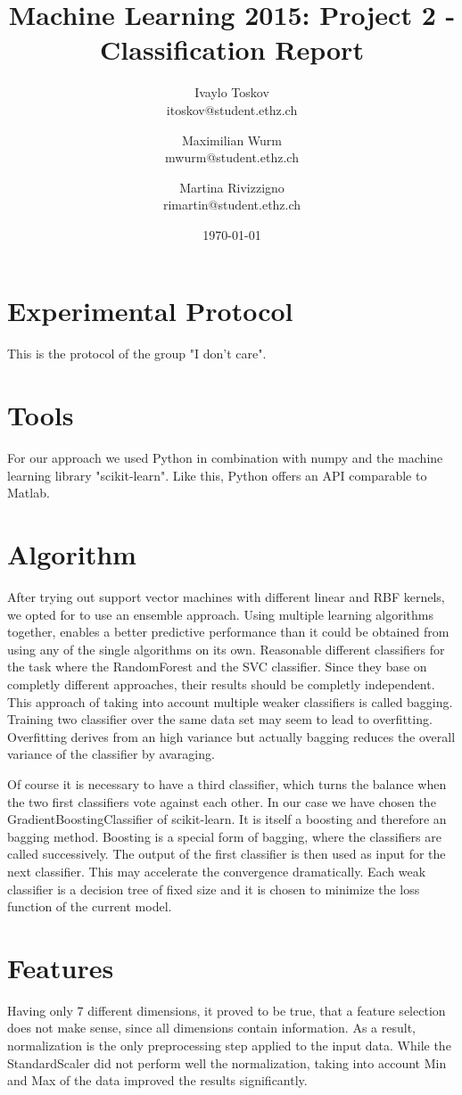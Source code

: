 \documentclass[a4paper, 11pt]{article}
\title{Machine Learning 2015: Project 2 - Classification Report}
\author{Ivaylo Toskov \\ itoskov@student.ethz.ch \and Maximilian Wurm \\ mwurm@student.ethz.ch \and 
	Martina Rivizzigno \\ rimartin@student.ethz.ch\\}
\date{\today}
\begin{document}
	\maketitle
	
	\section*{Experimental Protocol}
	This is the protocol of the group "I don't care".
	
	\section{Tools}
	For our approach we used Python in combination with numpy and the machine learning library "scikit-learn". Like this, Python offers an API comparable to Matlab.
	
	\section{Algorithm}
	After trying out support vector machines with different linear and RBF kernels, we opted for to use an ensemble approach. Using multiple learning algorithms together, enables a better predictive performance than it could be obtained from using any of the single algorithms on its own. Reasonable different classifiers for the task where the RandomForest and the SVC classifier. Since they base on completly different approaches, their results should be completly independent. 
	This approach of taking into account multiple weaker classifiers is called bagging. Training two classifier over the same data set may seem to lead to overfitting. Overfitting derives from an high variance but actually bagging reduces the overall variance of the classifier by avaraging. 
	
	Of course it is necessary to have a third classifier, which turns the balance when the two first classifiers vote against each other. In our case we have chosen the  GradientBoostingClassifier of scikit-learn. It is itself a boosting and therefore an bagging method. Boosting is a special form of bagging, where the classifiers are called successively. The output of the first classifier is then used as input for the next classifier. This may accelerate the convergence dramatically. 
	Each weak classifier is a decision tree of fixed size and it is chosen to minimize the loss function of the current model.
	
	\section{Features}
	Having only 7 different dimensions, it proved to be true, that a feature selection does not make sense, since all dimensions contain information. As a result, normalization is the only preprocessing step applied to the input data. While the StandardScaler did not perform well the normalization, taking into account Min and Max of the data improved the results significantly. 
	
\end{document}
